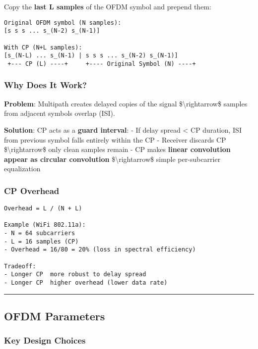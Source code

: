 Copy the \textbf{last L samples} of the OFDM symbol and prepend them:

\begin{verbatim}
Original OFDM symbol (N samples):
[s s s ... s_(N-2) s_(N-1)]

With CP (N+L samples):
[s_(N-L) ... s_(N-1) | s s s ... s_(N-2) s_(N-1)]
 +--- CP (L) ----+     +---- Original Symbol (N) ----+
\end{verbatim}

\subsubsection{Why Does It Work?}\label{why-does-it-work}

\textbf{Problem}: Multipath creates delayed copies of the signal
\$\textbackslash rightarrow\$ samples from adjacent symbols overlap
(ISI).

\textbf{Solution}: CP acts as a \textbf{guard interval}: - If delay
spread \textless{} CP duration, ISI from previous symbol falls entirely
within the CP - Receiver discards CP \$\textbackslash rightarrow\$ only
clean samples remain - CP makes \textbf{linear convolution appear as
circular convolution} \$\textbackslash rightarrow\$ simple
per-subcarrier equalization

\subsubsection{CP Overhead}\label{cp-overhead}

\begin{verbatim}
Overhead = L / (N + L)

Example (WiFi 802.11a):
- N = 64 subcarriers
- L = 16 samples (CP)
- Overhead = 16/80 = 20% (loss in spectral efficiency)

Tradeoff:
- Longer CP  more robust to delay spread
- Longer CP  higher overhead (lower data rate)
\end{verbatim}

\begin{center}\rule{0.5\linewidth}{0.5pt}\end{center}

\subsection{\texorpdfstring{ OFDM
Parameters}{ OFDM Parameters}}\label{ofdm-parameters}

\subsubsection{Key Design Choices}\label{key-design-choices}

